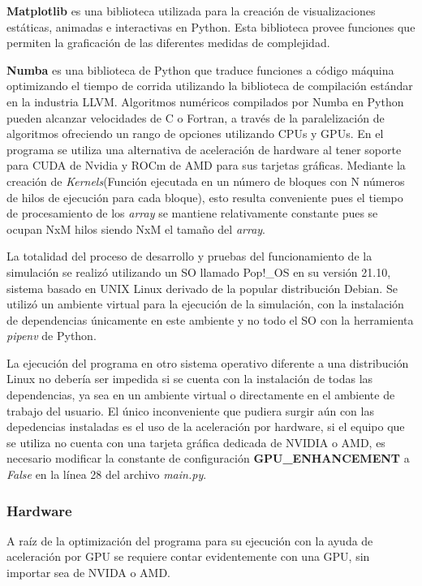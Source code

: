 \documentclass[]{article}
\begin{document}
		\hfill \break
		
		\textbf{Matplotlib} es una biblioteca utilizada para la creación de visualizaciones estáticas, animadas e interactivas en Python. Esta biblioteca provee funciones que permiten la graficación de las diferentes medidas de complejidad.
		
		\hfill \break
		
		\textbf{Numba} es una biblioteca de Python que traduce funciones a código máquina optimizando el tiempo de corrida utilizando la biblioteca de compilación estándar en la industria LLVM. Algoritmos numéricos compilados por Numba en Python pueden alcanzar velocidades de C o Fortran, a través de la paralelización de algoritmos ofreciendo un rango de opciones utilizando CPUs y GPUs.
		En el programa se utiliza una alternativa de aceleración de hardware al tener soporte para CUDA de Nvidia y ROCm de AMD para sus tarjetas gráficas. Mediante la creación de \textit{Kernels}(Función ejecutada en un número de bloques con N números de hilos de ejecución para cada bloque), esto resulta conveniente pues el tiempo de procesamiento de los \textit{array} se mantiene relativamente constante pues se ocupan NxM hilos siendo NxM el tamaño del \textit{array}.
		
		\hfill \break
		
		La totalidad del proceso de desarrollo y pruebas del funcionamiento de la simulación se realizó utilizando un SO llamado Pop!\_OS en su versión 21.10, sistema basado en UNIX Linux derivado de la popular distribución Debian.
		Se utilizó un ambiente virtual para la ejecución de la simulación, con la instalación de dependencias únicamente en este ambiente y no todo el SO con la herramienta \textit{pipenv} de Python.
		
		\hfill \break
		
		La ejecución del programa en otro sistema operativo diferente a una distribución Linux no debería ser impedida si se cuenta con la instalación de todas las dependencias, ya sea en un ambiente virtual o directamente en el ambiente de trabajo del usuario. El único inconveniente que pudiera surgir aún con las depedencias instaladas es el uso de la aceleración por hardware, si el equipo que se utiliza no cuenta con una tarjeta gráfica dedicada de NVIDIA o AMD, es necesario modificar la constante de configuración \textbf{GPU\_ENHANCEMENT} a \textit{False} en la línea 28 del archivo \textit{main.py}.
	
		\subsubsection{Hardware}
			A raíz de la optimización del programa para su ejecución con la ayuda de aceleración por GPU se requiere contar evidentemente con una GPU, sin importar sea de NVIDA o AMD.
			
\end{document}
